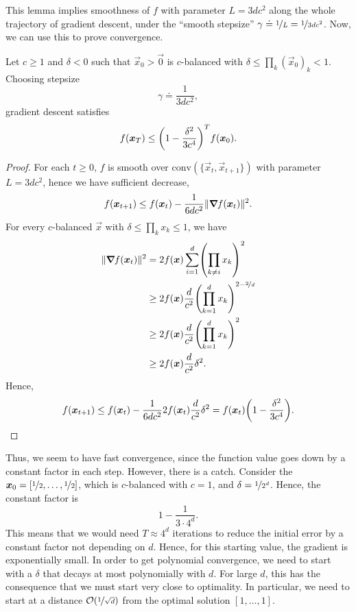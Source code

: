 This lemma implies smoothness of $f$ with parameter $L=3dc^2$ along the whole trajectory of
gradient descent, under the ``smooth stepsize'' $\gamma \doteq \nicefrac{1}{L} =
    \nicefrac{1}{3dc^2}$. Now, we can use this to prove convergence.

\begin{theorem}
    Let $c \geq 1$ and $\delta < 0$ such that $\vec{x}_0 > \vec{0}$ is $c$-balanced with
    $\delta \leq \prod_k (\vec{x}_0)_k < 1$. Choosing stepsize \[
        \gamma \doteq \frac{1}{3dc^2},
    \]
    gradient descent satisfies \[
        f(\vec{x}_T) \leq \lft( 1- \frac{\delta^2}{3c^4} \rgt)^T f(\vec{x}_0).
    \]
\end{theorem}

\begin{proof}
    For each $t \geq 0$, $f$ is smooth over $\mathrm{conv}(\{ \vec{x}_t, \vec{x}_{t+1} \})$ with
    parameter $L = 3dc^2$, hence we have sufficient decrease, \[
        f(\vec{x}_{t+1}) \leq f(\vec{x}_t) - \frac{1}{6dc^2} \| \grad{f(\vec{x}_t)}{} \|^2.
    \]
    For every $c$-balanced $\vec{x}$ with $\delta \leq \prod_k x_k \leq 1$, we have
    \begin{align*}
        \| \grad{f(\vec{x}_t)}{} \|^2 & = 2f(\vec{x}) \sum_{i=1}^{d} \lft( \prod_{k \neq i} x_k \rgt)^2                      \\
                                      & \geq 2 f(\vec{x}) \frac{d}{c^2} \lft( \prod_{k=1}^{d} x_k \rgt)^{2- \nicefrac{2}{d}} \\
                                      & \geq 2 f(\vec{x}) \frac{d}{c^2} \lft( \prod_{k=1}^{d} x_k \rgt)^2                    \\
                                      & \geq 2 f(\vec{x}) \frac{d}{c^2} \delta^2.
    \end{align*}
    Hence, \[
        f(\vec{x}_{t+1}) \leq f(\vec{x}_t) - \frac{1}{6dc^2} 2 f(\vec{x}_t) \frac{d}{c^2}\delta^2 = f(\vec{x}_t) \lft( 1 - \frac{\delta^2}{3c^4} \rgt).
    \]
\end{proof}

Thus, we seem to have fast convergence, since the function value goes down by a constant factor in
each step. However, there is a catch. Consider the $\vec{x}_0 = [\nicefrac{1}{2}, \ldots,
    \nicefrac{1}{2}]$, which is $c$-balanced with $c=1$, and $\delta = \nicefrac{1}{2^d}$. Hence, the
constant factor is \[
    1 - \frac{1}{3\cdot 4^d}.
\]
This means that we would need $T \approx 4^d$ iterations to reduce the initial error by a constant
factor not depending on $d$. Hence, for this starting value, the gradient is exponentially small.
In order to get polynomial convergence, we need to start with a $\delta$ that decays at most
polynomially with $d$. For large $d$, this has the consequence that we must start very close to
optimality. In particular, we need to start at a distance $\bigo{\nicefrac{1}{\sqrt{d}}}$ from the
optimal solution $[1, \ldots, 1]$.
